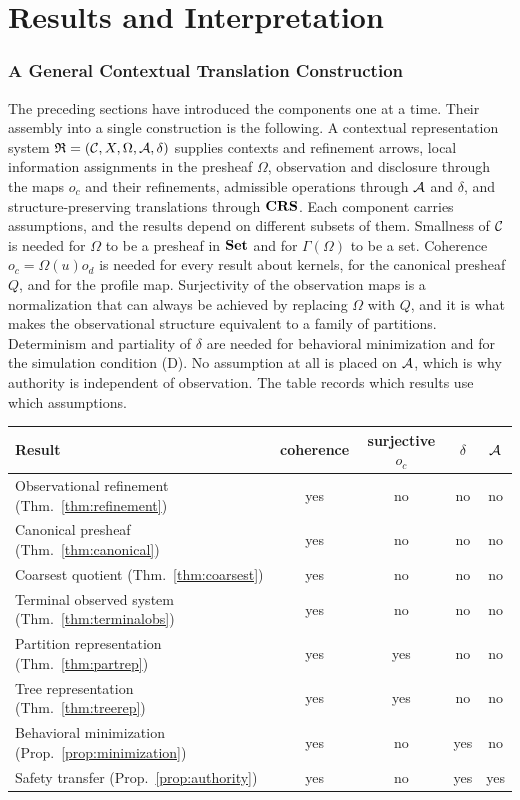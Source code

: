 \part{Results and Interpretation}

\section{A General Contextual Translation Construction}

The preceding sections have introduced the components one at a time. Their assembly into a single construction is the following. A contextual representation system $\mathfrak R=(\mathcal C,X,\Omega,\mathcal A,\delta)$ supplies contexts and refinement arrows, local information assignments in the presheaf $\Omega$, observation and disclosure through the maps $o_c$ and their refinements, admissible operations through $\mathcal A$ and $\delta$, and structure-preserving translations through $\mathbf{CRS}$. Each component carries assumptions, and the results depend on different subsets of them. Smallness of $\mathcal C$ is needed for $\Omega$ to be a presheaf in $\mathbf{Set}$ and for $\Gamma(\Omega)$ to be a set. Coherence $o_c=\Omega(u)o_d$ is needed for every result about kernels, for the canonical presheaf $Q$, and for the profile map. Surjectivity of the observation maps is a normalization that can always be achieved by replacing $\Omega$ with $Q$, and it is what makes the observational structure equivalent to a family of partitions. Determinism and partiality of $\delta$ are needed for behavioral minimization and for the simulation condition (D). No assumption at all is placed on $\mathcal A$, which is why authority is independent of observation. The table records which results use which assumptions.

\begin{center}
\small
\begin{tabular}{lcccc}
\toprule
Result & coherence & surjective $o_c$ & $\delta$ & $\mathcal A$\\
\midrule
Observational refinement (Thm.~\ref{thm:refinement}) & yes & no & no & no\\
Canonical presheaf (Thm.~\ref{thm:canonical}) & yes & no & no & no\\
Coarsest quotient (Thm.~\ref{thm:coarsest}) & yes & no & no & no\\
Terminal observed system (Thm.~\ref{thm:terminalobs}) & yes & no & no & no\\
Partition representation (Thm.~\ref{thm:partrep}) & yes & yes & no & no\\
Tree representation (Thm.~\ref{thm:treerep}) & yes & yes & no & no\\
Behavioral minimization (Prop.~\ref{prop:minimization}) & yes & no & yes & no\\
Safety transfer (Prop.~\ref{prop:authority}) & yes & no & yes & yes\\
\bottomrule
\end{tabular}
\end{center}

